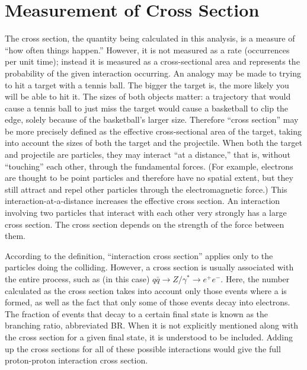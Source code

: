 \section{Measurement of Cross Section}
\label{over:xsec}

The cross section, the quantity being calculated in this analysis, 
is a measure of ``how often things happen.''  
However, it is not measured as a rate (occurrences per unit time); 
instead it is measured as a cross-sectional area 
and represents the probability of the given interaction occurring.  
An analogy may be made to trying to hit a target with a tennis ball.  
The bigger the target is, the more likely you will be able to hit it.  
The sizes of both objects matter: 
a trajectory that would cause a tennis ball to just miss the target 
would cause a basketball to clip the edge, 
solely because of the basketball's larger size.  
Therefore ``cross section'' may be more precisely defined as the 
effective cross-sectional area of the target, 
taking into account the sizes of both the target and the projectile.  
When both the target and projectile are particles, %
they may interact ``at a distance,'' that is, without ``touching'' each other, 
through the fundamental forces.  
(For example, electrons are thought to be point particles 
and therefore have no spatial extent, 
but they still attract and repel other particles 
through the electromagnetic force.) 
This interaction-at-a-distance increases the effective cross section.  
An interaction involving two particles that 
interact with each other very strongly has a large cross section.  
The cross section depends on the strength of the force between them.  

According to the definition, ``interaction cross section'' applies only to 
the particles doing the colliding.  
However, a cross section is usually associated with the entire process, 
such as (in this case) 
$ q\bar{q} \rightarrow Z/ \gamma^{*} \rightarrow e^{+} e^{-} $.  %
Here, the number calculated as the cross section takes into account 
only those events where a \Zg is formed, 
as well as the fact that only some of those events decay into electrons.  
The fraction of events that decay to a certain final state is known as 
the branching ratio, abbreviated BR.  
When it is not explicitly mentioned along with the cross section 
for a given final state, it is understood to be included.  
Adding up the cross sections for all of these possible interactions 
would give the full proton-proton interaction cross section.  

